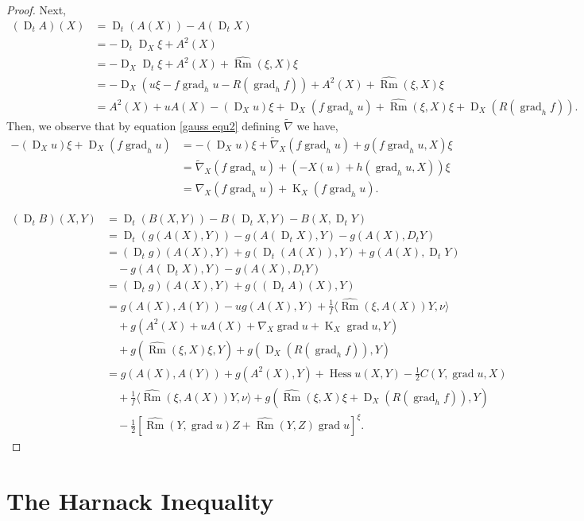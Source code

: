 \documentclass{amsart}
\theoremstyle{definition}
\theoremstyle{remark}
\newcommand{\ip}[2]{\ensuremath{\langle{#1},{#2}\rangle}}
\DeclareMathOperator{\grad}{grad}
\DeclareMathOperator{\Rm}{Rm}
\DeclareMathOperator{\hess}{Hess}
\DeclareMathOperator{\diff}{K}
\DeclareMathOperator{\D}{D}
\numberwithin{equation}{section}
\begin{document}
\begin{proof}
Next,
\[
\begin{split}
(\D_t A)(X) &= \D_t (A(X)) - A(\D_t X) \\
&= - \D_t \D_X \xi + A^2(X) \\
&= -\D_X \D_t \xi + A^2(X) + \widehat{\Rm} (\xi, X) \xi \\
&= -\D_X \left(u\xi - f\grad_h u - R(\grad_h f)\right) + A^2(X) + \widehat{\Rm} (\xi, X) \xi \\
&= A^2(X) + u A(X) -(\D_X u)\xi + \D_X (f\grad_h u) + \widehat{\Rm} (\xi, X) \xi + \D_X (R(\grad_h f)).
\end{split}
\]
Then, we observe that by equation \eqref{gauss equ2} defining $\tilde{\nabla}$ we have,
\[
\begin{split}
-(\D_X u)\xi + \D_X (f\grad_h u) &= -(\D_X u)\xi + \tilde{\nabla}_X (f\grad_h u) + g(f \grad_h u, X) \xi \\
&= \tilde{\nabla}_X (f\grad_h u) + (-X(u) + h(\grad_h u, X))\xi \\
&= \nabla_X (f\grad_h u) + \diff_X (f\grad_h u).
\end{split}
\]

\[
\begin{split}
(\D_t B) (X, Y) &= \D_t (B(X, Y)) - B(\D_t X, Y) - B(X, \D_t Y) \\
&= \D_t (g(A(X), Y)) - g(A(\D_tX), Y) - g(A(X), D_t Y) \\
&= (\D_t g)(A(X), Y) + g(\D_t(A(X)), Y) + g(A(X), \D_t Y) \\
&\quad - g(A(\D_tX), Y) - g(A(X), D_t Y) \\
&= (\D_t g)(A(X), Y) + g((\D_t A)(X), Y) \\
&= g(A(X), A(Y)) - u g(A(X), Y) + \frac{1}{f} \ip{\hat{\Rm} (\xi, A(X))Y}{\nu} \\
&\quad + g(A^2(X) + u A(X) + \nabla_X \grad u + \diff_X \grad u, Y) \\
&\quad + g(\widehat{\Rm}(\xi, X)\xi, Y) + g(\D_X (R(\grad_h f)), Y) \\
&= g(A(X), A(Y)) + g(A^2(X), Y) + \hess u (X, Y) -\frac{1}{2} C(Y, \grad u, X) \\
&\quad +\frac{1}{f} \ip{\hat{\Rm} (\xi, A(X))Y}{\nu} + g(\widehat{\Rm}(\xi, X)\xi  + \D_X (R(\grad_h f)), Y) \\
&\quad -\frac{1}{2} \left[\widehat{\Rm} (Y, \grad u)Z +  \widehat{\Rm} (Y, Z) \grad u\right]^{\xi}.
\end{split}
\]
\end{proof}

\section{The Harnack Inequality}
\end{document}
